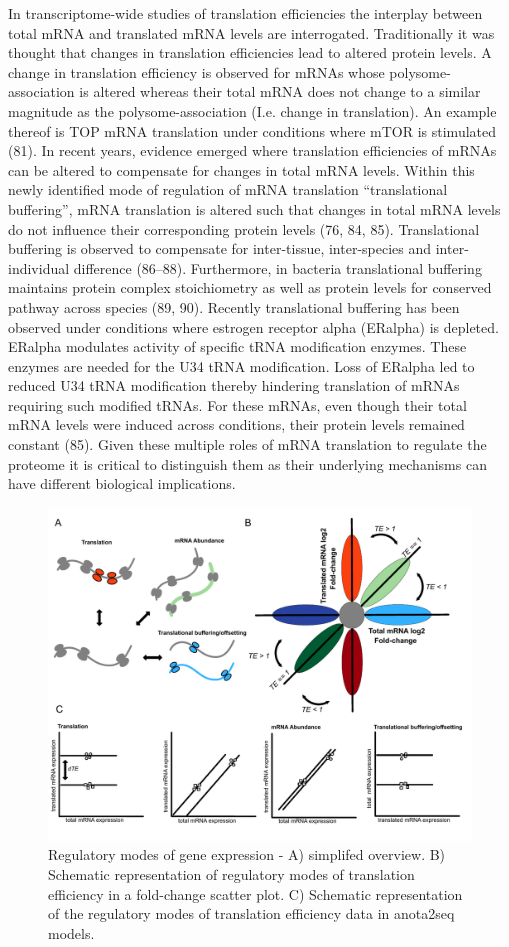 \documentclass[12pt,openany]{book}
\begin{document}
In transcriptome-wide studies of translation efficiencies the interplay
between total mRNA and translated mRNA levels are interrogated.
Traditionally it was thought that changes in translation efficiencies
lead to altered protein levels. A change in translation efficiency is
observed for mRNAs whose polysome-association is altered whereas their
total mRNA does not change to a similar magnitude as the
polysome-association (I.e. change in translation). An example thereof is
TOP mRNA translation under conditions where mTOR is stimulated (81). In
recent years, evidence emerged where translation efficiencies of mRNAs
can be altered to compensate for changes in total mRNA levels. Within
this newly identified mode of regulation of mRNA translation
``translational buffering'', mRNA translation is altered such that
changes in total mRNA levels do not influence their corresponding
protein levels (76, 84, 85). Translational buffering is observed to
compensate for inter-tissue, inter-species and inter-individual
difference (86--88). Furthermore, in bacteria translational buffering
maintains protein complex stoichiometry as well as protein levels for
conserved pathway across species (89, 90). Recently translational
buffering has been observed under conditions where estrogen receptor
alpha (ERalpha) is depleted. ERalpha modulates activity of specific tRNA
modification enzymes. These enzymes are needed for the U34 tRNA
modification. Loss of ERalpha led to reduced U34 tRNA modification
thereby hindering translation of mRNAs requiring such modified tRNAs.
For these mRNAs, even though their total mRNA levels were induced across
conditions, their protein levels remained constant (85). Given these
multiple roles of mRNA translation to regulate the proteome it is
critical to distinguish them as their underlying mechanisms can have
different biological implications.

\begin{figure}
  \includegraphics{./figures/geneModes.pdf}
  \caption{Regulatory modes of gene expression - A) simplifed overview. B) Schematic representation of regulatory modes of translation efficiency in a fold-change scatter plot. C) Schematic representation of the regulatory modes of translation efficiency data in anota2seq models. \label{geneModes}}
\end{figure}
\end{document}
